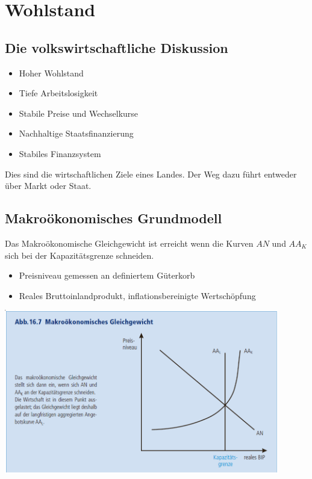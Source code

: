\section{Wohlstand}
\subsection{Die volkswirtschaftliche Diskussion}
\begin{itemize}
	\item Hoher Wohlstand
	\item Tiefe Arbeitslosigkeit
	\item Stabile Preise und Wechselkurse
	\item Nachhaltige Staatsfinanzierung
	\item Stabiles Finanzsystem
\end{itemize}
Dies sind die wirtschaftlichen Ziele eines Landes. Der Weg dazu führt entweder über Markt oder Staat.
\subsection{Makroökonomisches Grundmodell}
\begin{minipage}{7cm}
Das Makroökonomische Gleichgewicht ist erreicht wenn die Kurven $AN$ und $AA_K$ sich bei der Kapazitätsgrenze schneiden. 
\begin{itemize}
	\item Preisniveau gemessen an definiertem Güterkorb
	\item Reales Bruttoinlandprodukt, inflationsbereinigte Wertschöpfung
\end{itemize}
\end{minipage}
\begin{minipage}{12cm}
		\includegraphics[width=12cm]{images/makro.png}
\end{minipage}


